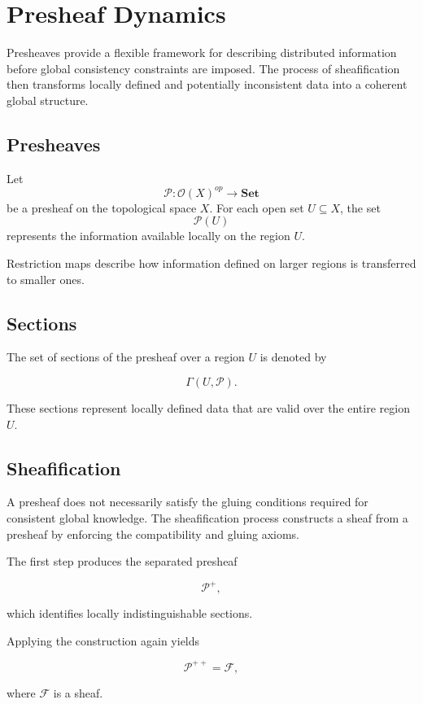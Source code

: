 \documentclass[12pt]{article}
\begin{document}
\section{Presheaf Dynamics}

Presheaves provide a flexible framework for describing distributed information before global consistency constraints are imposed. The process of sheafification then transforms locally defined and potentially inconsistent data into a coherent global structure.

\subsection{Presheaves}

Let
\[
\mathcal{P} : \mathcal{O}(X)^{op} \rightarrow \mathbf{Set}
\]
be a presheaf on the topological space $X$. For each open set $U \subseteq X$, the set
\[
\mathcal{P}(U)
\]
represents the information available locally on the region $U$.

Restriction maps describe how information defined on larger regions is transferred to smaller ones.

\subsection{Sections}

The set of sections of the presheaf over a region $U$ is denoted by

\[
\Gamma(U,\mathcal{P}).
\]

These sections represent locally defined data that are valid over the entire region $U$.

\subsection{Sheafification}

A presheaf does not necessarily satisfy the gluing conditions required for consistent global knowledge. The sheafification process constructs a sheaf from a presheaf by enforcing the compatibility and gluing axioms.

The first step produces the separated presheaf

\[
\mathcal{P}^+,
\]

which identifies locally indistinguishable sections.

Applying the construction again yields

\[
\mathcal{P}^{++} = \mathcal{F},
\]

where $\mathcal{F}$ is a sheaf.
\end{document}
